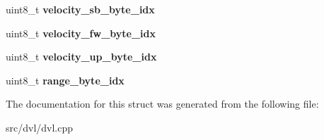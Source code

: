 \begin{DoxyCompactItemize}
uint8\+\_\+t {\bfseries velocity\+\_\+sb\+\_\+byte\+\_\+idx}
\item 
\mbox{\label{structparser__var__t_ad84bccea45c09dd8252328dbc6b7e649}} 
uint8\+\_\+t {\bfseries velocity\+\_\+fw\+\_\+byte\+\_\+idx}
\item 
\mbox{\label{structparser__var__t_a92e32f148ac0f8aa7f77bdc90513ba13}} 
uint8\+\_\+t {\bfseries velocity\+\_\+up\+\_\+byte\+\_\+idx}
\item 
\mbox{\label{structparser__var__t_ae5b70f178be99e8cde20be5ee53b5310}} 
uint8\+\_\+t {\bfseries range\+\_\+byte\+\_\+idx}
\end{DoxyCompactItemize}


The documentation for this struct was generated from the following file\+:\begin{DoxyCompactItemize}
\item 
src/dvl/dvl.\+cpp\end{DoxyCompactItemize}
